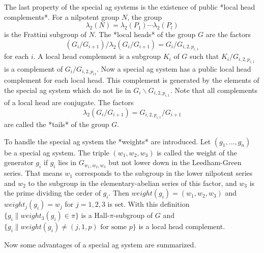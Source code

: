 The last property of the special ag systems is the existence of public
*local head complements*.  For a nilpotent group $N$, the group
$$
    \lambda_2(N) = \lambda_2(P_1) \cdots \lambda_2(P_l)
$$
is the Frattini subgroup of $N$.  The *local heads* of the group $G$ are
the factors
$$
  (G_i / G_{i+1}) / \lambda_2(G_i / G_{i+1}) = G_i / G_{i, 2,p_{i,1}}
$$
for each $i$.  A local head complement is a subgroup $K_i$ of $G$ such
that
$K_i / G_{i,2,p_{i,1}}$ is a complement  of  $G_i / G_{i,  2, p_{i  1}}$.
Now a special ag system has a public local head complement for each local
head. This complement is generated by the elements of the special ag
system which do not lie in $G_i \backslash G_{i,2,p_{i,1}}$. Note that
all complements of a local head are conjugate. The factors
$$
  \lambda_2(G_i / G_{i+1}) = G_{i, 2,p_{i,1}} / G_{i+1}
$$
are called  the *tails* of the group $G$. 

To handle the special ag system the *weights* are introduced.
Let $(g_1, \ldots, g_n)$ be a special ag system.
The triple $(w_1, w_2, w_3)$ is called the weight of the generator $g_i$
if $g_i$ lies in $G_{w_1, w_2, w_3}$ but not lower down in the
Leedham-Green series. That means $w_1$ corresponds to the subgroup in the
lower nilpotent series and $w_2$ to the subgroup in the
elementary-abelian series of this factor, and $w_3$ is the prime dividing
the order of $g_i$. Then $weight(g_i) = (w_1, w_2, w_3)$ and
$weight_j(g_i) = w_j$ for $j = 1,2,3$ is set.
With this definition $\{g_i \| weight_3(g_i) \in \pi\}$ is a
Hall-$\pi$-subgroup of $G$ and
$\{g_i \| weight(g_i) \neq (j, 1, p) \mbox{ for some } p \}$ is a local
head complement.

Now some advantages of a special ag system are summarized.

